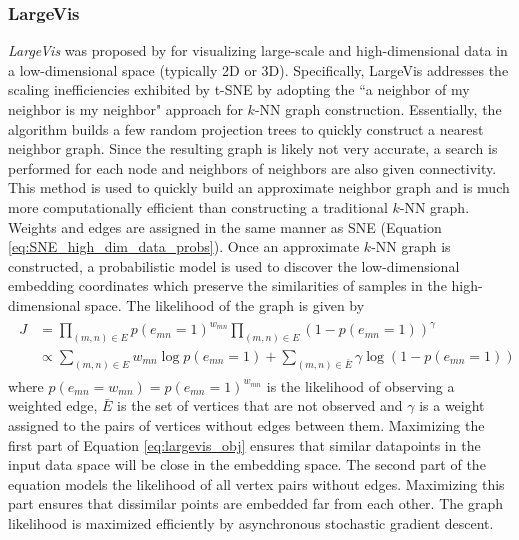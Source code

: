 \subsubsection{LargeVis} \label{sec:LargeVis}
\textit{LargeVis} was proposed by \cite{Tang2016LargeVis} for visualizing large-scale and high-dimensional data in a low-dimensional space (typically 2D or 3D).  Specifically, LargeVis addresses the scaling inefficiencies exhibited by t-SNE by adopting the ``a neighbor of my neighbor is my neighbor" approach for $k$-NN graph construction.  Essentially, the algorithm builds a few random projection trees to quickly construct a nearest neighbor graph.  Since the resulting graph is likely not very accurate, a search is performed for each node and neighbors of neighbors are also given connectivity.  This method is used to quickly build an approximate neighbor graph and is much more computationally efficient than constructing a traditional $k$-NN graph.  Weights and edges are assigned in the same manner as SNE (Equation \ref{eq:SNE_high_dim_data_probs}). Once an approximate $k$-NN graph is constructed, a probabilistic model is used to discover the low-dimensional embedding coordinates which preserve the similarities of samples in the high-dimensional space. The likelihood of the graph is given by 
\begin{align} \label{eq:largevis_obj}
	\begin{split}
		J &=  \prod_{(m,n) \in E}p(e_{mn}=1)^{w_{mn}} \prod_{(m,n) \in E}(1 - p(e_{mn}=1))^{\gamma}\\ 
		&\propto \sum_{(m,n) \in E} w_{mn} \log{p(e_{mn}=1)} +  \sum_{(m,n) \in \bar{E}} \gamma \log{(1 - p(e_{mn}=1))}
	\end{split}
\end{align}
\noindent
where $p(e_{mn}={w_{mn}}) = p(e_{mn}=1)^{w_{mn}}$ is the likelihood of observing a weighted edge, $\bar{E}$ is the set of vertices that are not observed and $\gamma$ is a weight assigned to the pairs of vertices without edges between them.  Maximizing the first part of Equation \ref{eq:largevis_obj} ensures that similar datapoints in the input data space will be close in the embedding space.  The second part of the equation models the likelihood of all vertex pairs without edges.  Maximizing this part ensures that dissimilar points are embedded far from each other.  The graph likelihood is maximized efficiently by asynchronous stochastic gradient descent.


